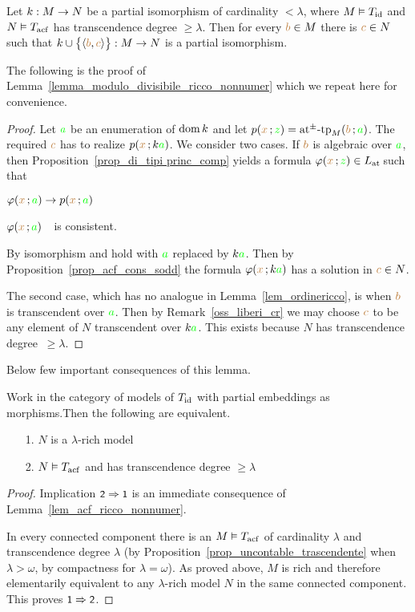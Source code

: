 \documentclass[creche.tex]{subfiles}
\begin{document}
\begin{lemma}\label{lem_acf_ricco_nonnumer}
Let $k:M\imp N$ be a partial isomorphism of cardinality $<\lambda$, where $M\models T_{\rm id}$ and $N\models T_{\rm acf}$ has transcendence degree $\ge\lambda$. Then for every ${\mr b}\in M$ there is ${\mr c}\in N$ such that $k\cup\big\{\<{\mr b},{\mr c}\>\big\}:M\imp N$ is a partial isomorphism.
\end{lemma}

The following is the proof of Lemma~\ref{lemma_modulo_divisibile_ricco_nonnumer} which we repeat here for convenience.

\begin{proof}
Let ${\gr a}$ be an enumeration of $\dom k$ and let $p({\mr x}\,;{\gr z})=\atpmtp_M({\mr b}\,;{\gr a})$. The required ${\mr c}$ has to realize $p({\mr x}\,;k{\gr a})$. We consider two cases. If ${\mr b}$ is algebraic over ${\gr a}$, then Proposition~\ref{prop_di_tipi princ_comp} yields a formula $\phi({\mr x}\,;{\gr z})\in\atL$ such that 

\noindent{}\hspace{5ex} $\phi({\mr x}\,;{\gr a})\imp p({\mr x}\,;{\gr a})$

\noindent{}\hspace{5ex} $\phi({\mr x}\,;{\gr a})$\ \ is consistent.

By isomorphism  and  hold with ${\gr a}$ replaced by $k{\gr a}$. Then by Proposition~\ref{prop_acf_cons_sodd} the formula $\phi({\mr x}\,;k{\gr a})$ has a solution in ${\mr c}\in N$.

The second case, which has no analogue in Lemma~\ref{lem_ordinericco}, is when ${\mr b}$ is transcendent over ${\gr a}$. Then by  Remark~\ref{oss_liberi_cr} we may choose ${\mr c}$ to be any element of $N$ transcendent over $k{\gr a}$. This exists because $N$ has transcendence degree $\ \ge\lambda$. 
\end{proof}

Below few important consequences of this lemma.

\begin{corollary}\label{corol_acfUltraOmog}
Work in the category of models of $T_{\rm id}$ with partial embeddings as morphisms.Then the following are equivalent.
\begin{itemize}
\item[1.] $N$ is a $\lambda$-rich model
\item[2.] $N\models T_{\rm acf}$ and has transcendence degree $\ge\lambda$
\end{itemize}
\end{corollary}
\begin{proof}
Implication $\ssf{2}\IMP\ssf{1}$ is an immediate consequence of Lemma~\ref{lem_acf_ricco_nonnumer}. 

In every connected component there is an $M\models T_{\rm acf}$ of cardinality $\lambda$ and transcendence degree $\lambda$ (by Proposition~\ref{prop_uncontable_trascendente} when $\lambda>\omega$, by compactness for $\lambda=\omega$). As proved above, $M$ is rich and therefore elementarily equivalent to any $\lambda$-rich model $N$ in the same connected component. This proves $\ssf{1}\IMP\ssf{2}$.
\end{proof}
\end{document}
